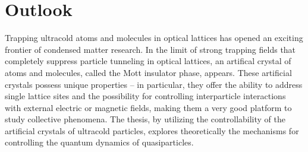 \chapter{Outlook}
\label{ch:conclusion}

Trapping ultracold atoms and molecules in optical lattices has opened an exciting frontier of condensed 
matter research\cite{Baranov2012}. In the limit of strong trapping fields that completely suppress particle tunneling
in optical lattices, an artifical crystal of atoms and molecules, called the Mott insulator phase, appears. These artificial crystals possess 
unique properties -- in particular, they offer  the ability to address single lattice sites\cite{atom-mott1, atom-mott2} and the possibility for controlling interparticle interactions with external electric or magnetic fields\cite{quemener2012, Baranov2012},  making them a very good platform to
study collective phenomena\cite{our-njp-review, quemener2012, Baranov2012}. The thesis, by utilizing  the controllability of the artificial crystals of ultracold particles, explores theoretically the mechanisms for  
controlling the quantum dynamics
of quasiparticles. 


